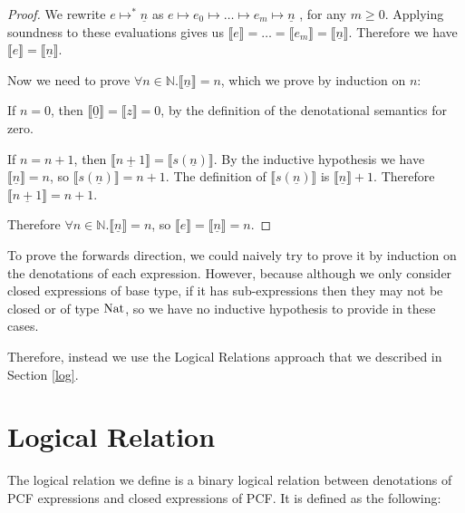 \begin{proof}
We rewrite $e \mapsto^* \underline{n}$ as $e \mapsto e_0 \mapsto \dots \mapsto e_m \mapsto \underline{n}$ , for any $m \geq 0$. Applying soundness to these evaluations gives us $\llbracket e\rrbracket = \dots = \llbracket e_m \rrbracket = \llbracket \underline{n} \rrbracket$. Therefore we have $\llbracket  e \rrbracket = \llbracket \underline{n} \rrbracket$.

Now we need to prove $\forall n \in \mathbb{N}. \llbracket \underline{n} \rrbracket = n$, which we prove by induction on $n$:

If $n = 0$, then $\llbracket \underline{0} \rrbracket = \llbracket z \rrbracket = 0$, by the definition of the denotational semantics for zero.


If $n = n + 1$, then $\llbracket \underline{n + 1} \rrbracket = \llbracket s(\underline{n}) \rrbracket$. By the inductive hypothesis we have $\llbracket \underline{n} \rrbracket = n$, so $\llbracket s(\underline{n}) \rrbracket = n + 1$. The definition of $\llbracket s(\underline{n}) \rrbracket$ is $\llbracket  \underline{n} \rrbracket + 1$. Therefore $\llbracket \underline{n + 1} \rrbracket = n + 1$.


Therefore $\forall n \in \mathbb{N}. \llbracket \underline{n} \rrbracket  = n$, so $\llbracket e \rrbracket =  \llbracket \underline{n} \rrbracket  = n$.

\end{proof}

To prove the forwards direction, we could naively try to prove it by induction on the denotations of each expression. However, because although we only consider closed expressions of base type, if it has sub-expressions then they may not be closed or of type $\operatorname{Nat}$, so we have no inductive hypothesis to provide in these cases.

Therefore, instead we use the Logical Relations approach that we described in Section \ref{log}.

\section{Logical Relation}
The logical relation we define is a binary logical relation between denotations of PCF expressions and closed expressions of PCF. It is defined as the following:

